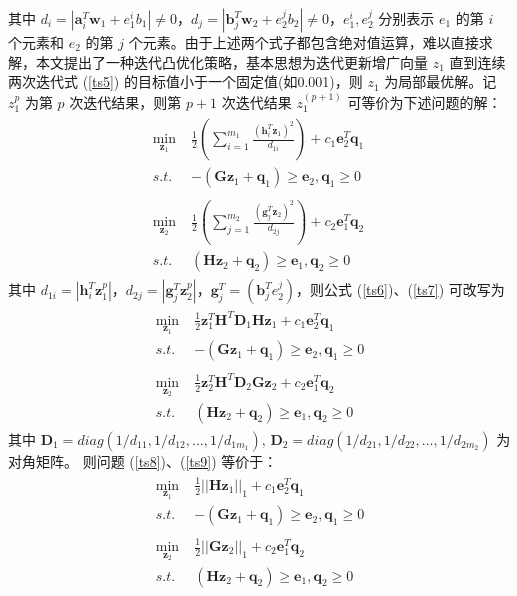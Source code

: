 其中 $d_i=|\mathbf{a}_i^T\mathbf{w}_1+e_1^ib_1|\ne 0$，$d_j=|\mathbf{b}_j^T\mathbf{w}_2+e_2^jb_2|\ne 0$，$e_1^i,e_2^j$ 分别表示 $e_1$ 的第 $i$ 个元素和 $e_2$ 的第 $j$ 个元素。由于上述两个式子都包含绝对值运算，难以直接求解，本文提出了一种迭代凸优化策略，基本思想为迭代更新增广向量 $z_1$ 直到连续两次迭代式 (\ref{ts5}) 的目标值小于一个固定值(如0.001)，则 $z_1$ 为局部最优解。记 $z_1^p$ 为第 $p$ 次迭代结果，则第 $p+1$ 次迭代结果 $z_1^{(p+1)}$ 可等价为下述问题的解：
\begin{align}
\begin{split}
\label{ts6}
	\min\limits_{\mathbf{z}_1} \;& \frac{1}{2}(\sum_{i=1}^{m_1}\frac{(\mathbf{h}_i^T\mathbf{z}_1)^2}{d_{1i}})+c_1\mathbf{e}_2^T\mathbf{q}_1 \ \\
	s.t.\;& -(\mathbf{Gz}_1+\mathbf{q}_1) \geq \mathbf{e}_2,\mathbf{q}_1\geq 0
\end{split}
\\
\begin{split}
\label{ts7}
	\min\limits_{\mathbf{z}_2} \;& \frac{1}{2}(\sum_{j=1}^{m_2}\frac{(\mathbf{g}_j^T\mathbf{z}_2)^2}{d_{2j}})+c_2\mathbf{e}_1^T\mathbf{q}_2  \\
	s.t. \;& (\mathbf{Hz}_2+\mathbf{q}_2)\geq \mathbf{e}_1, \mathbf{q}_2\geq 0
\end{split}	
\end{align}
其中 $d_{1i}=|\mathbf{h}_i^T\mathbf{z}_1^p|$，$d_{2j}=|\mathbf{g}_j^T\mathbf{z}_2^p|$，$\mathbf{g}_j^T=(\mathbf{b}_j^Te_2^j)$，则公式 (\ref{ts6})、(\ref{ts7}) 可改写为
\begin{align}
\begin{split}
\label{ts8}
	\min\limits_{\mathbf{z}_1} \;& \frac{1}{2}\mathbf{z}_1^T\mathbf{H}^T\mathbf{D}_1\mathbf{Hz}_1+c_1\mathbf{e}_2^T\mathbf{q}_1 \\
	s.t.\;& -(\mathbf{Gz}_1+\mathbf{q}_1) \geq \mathbf{e}_2,\mathbf{q}_1\geq 0
\end{split}
\\
\begin{split}
\label{ts9}
	\min\limits_{\mathbf{z}_2} \;& \frac{1}{2}\mathbf{z}_2^T\mathbf{H}^T\mathbf{D}_2\mathbf{Gz}_2+c_2\mathbf{e}_1^T\mathbf{q}_2 \\
	s.t. \;& (\mathbf{Hz}_2+\mathbf{q}_2)\geq \mathbf{e}_1, \mathbf{q}_2\geq 0
\end{split}
\end{align}
其中 $\mathbf{D}_1=diag(1/d_{11},1/d_{12},\ldots,1/d_{1m_1}),\,\mathbf{D}_2=diag(1/d_{21},1/d_{22},\ldots,1/d_{2m_2})$ 为对角矩阵。
则问题 (\ref{ts8})、(\ref{ts9}) 等价于：
\begin{align}
\begin{split}
	\min\limits_{\mathbf{z}_1} \;& \frac{1}{2}||\mathbf{Hz}_1||_1+c_1\mathbf{e}_2^T\mathbf{q}_1 \\
	s.t.\;& -(\mathbf{Gz}_1+\mathbf{q}_1) \geq \mathbf{e}_2,\mathbf{q}_1\geq 0
\end{split}
\\
\begin{split}
	\min\limits_{\mathbf{z}_2} \;& \frac{1}{2}||\mathbf{Gz}_2||_1+c_2\mathbf{e}_1^T\mathbf{q}_2 \\
	s.t. \;& (\mathbf{Hz}_2+\mathbf{q}_2)\geq \mathbf{e}_1, \mathbf{q}_2\geq 0
\end{split}
\end{align}
